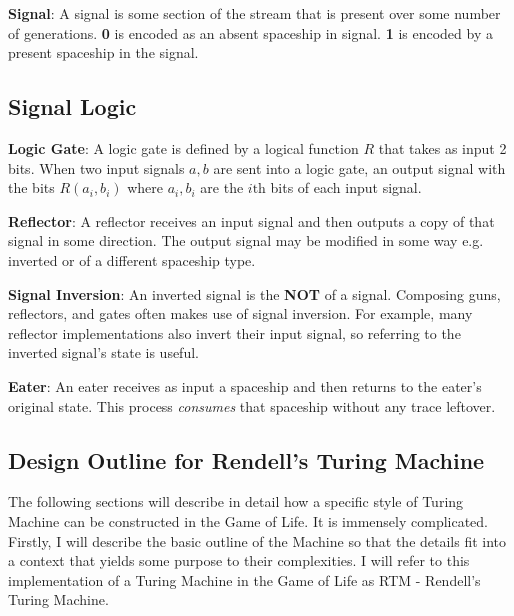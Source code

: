 \documentclass{article}
\begin{document}
\vspace{1em}

\noindent\textbf{Signal}: A signal is some section of the stream that is present over some number of generations. \textbf{0} is encoded as an absent spaceship in signal. \textbf{1} is encoded by a present spaceship in the signal.

\vspace{1em}
\subsection{Signal Logic}
\noindent\textbf{Logic Gate}: A logic gate is defined by a logical function $  R  $ that takes as input 2 bits. When two input signals $  a, b  $ are sent into a logic gate, an output signal with the bits $  R(a_i, b_i)  $ where $  a_i, b_i  $ are the $  i\text{th}  $ bits of each input signal.

\vspace{1em}

\noindent\textbf{Reflector}: A reflector receives an input signal and then outputs a copy of that signal in some direction. The output signal may be modified in some way e.g. inverted or of a different spaceship type.

\vspace{1em}

\noindent\textbf{Signal Inversion}: An inverted signal is the \textbf{NOT} of a signal. Composing guns, reflectors, and gates often makes use of signal inversion. For example, many reflector implementations also invert their input signal, so referring to the inverted signal's state is useful.

\vspace{1em}

\noindent\textbf{Eater}: An eater receives as input a spaceship and then returns to the eater's original state. This process \textit{consumes} that spaceship without any trace leftover.

\vspace{1em}
\subsection{Design Outline for Rendell's Turing Machine}


The following sections will describe in detail how a specific style of Turing Machine can be constructed in the Game of Life. It is immensely complicated. Firstly, I will describe the basic outline of the Machine so that the details fit into a context that yields some purpose to their complexities. I will refer to this implementation of a Turing Machine in the Game of Life as RTM - Rendell's Turing Machine.
\end{document}
